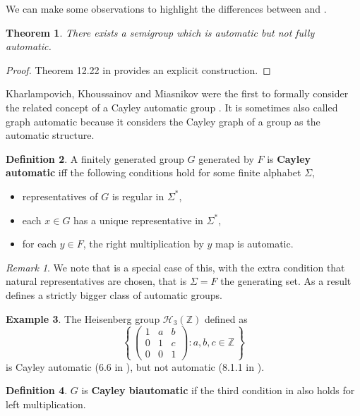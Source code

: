 \documentclass[british,a4paper,]{scrartcl}
\newtheorem{theorem}{Theorem}
\theoremstyle{definition}
\newtheorem{definition}[theorem]{Definition}
\newtheorem{example}[theorem]{Example}
\theoremstyle{remark}
\newtheorem*{remark}{Remark}
\newcommand{\set}[1]{\left\{\, #1 \,\right\}}
\newcommand{\Z}{\mathbb{Z}}
\begin{document}
We can make some observations to
highlight the differences between  and .
\begin{theorem}
    There exists a semigroup which is automatic but not fully automatic.
\end{theorem}
\begin{proof}
    Theorem 12.22 in \autocite{fullautomatatheory} provides an explicit construction.
\end{proof}

Kharlampovich, Khoussainov and Miasnikov were the first to formally consider the related concept of a Cayley automatic group \autocite{KKM}.
It is sometimes also called graph automatic because it considers the Cayley graph of a group as the automatic structure.
\begin{definition} \label{defn:cayleyauto}
    A finitely generated group \(G\) generated by \(F\) is \textbf{Cayley automatic} iff
    the following conditions hold for some finite alphabet \(\Sigma\),
    \begin{itemize}
        \item representatives of \(G\) is regular in \(\Sigma^*\),
        \item each \(x\in G\) has a unique representative in \(\Sigma^*\),
        \item for each \(y\in F\), the right multiplication by \(y\) map is automatic.
    \end{itemize}
\end{definition}

\begin{remark}
    We note that  is a special case of this,
    with the extra condition that natural representatives are chosen,
    that is \(\Sigma = F\) the generating set.
    As a result  defines a strictly bigger class of automatic groups.
\end{remark}

\begin{example}
    The Heisenberg group \(\mathcal{H}_3(\Z)\) defined as
    \[\set{\begin{pmatrix}1&a&b\\0&1&c\\0&0&1\end{pmatrix}: a,b,c\in\Z}\]
    is Cayley automatic (6.6 in \autocite{KKM}), but not automatic (8.1.1 in \autocite{Epstein}).
\end{example}

\begin{definition} \label{defn:cayleybiauto}
    \(G\) is \textbf{Cayley biautomatic} if
    the third condition in  also holds for left multiplication.
\end{definition}
\end{document}
